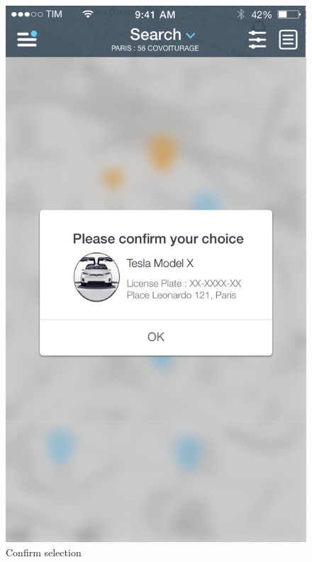 \documentclass[12pt]{article}
\begin{document}
 	 	\begin{figure}
		 \centering	
		 \includegraphics[scale=0.25]{Images/Conferma.png}
		 \caption{Confirm selection}
		 \endminipage
		 \centering

\end{figure}
\end{document}
